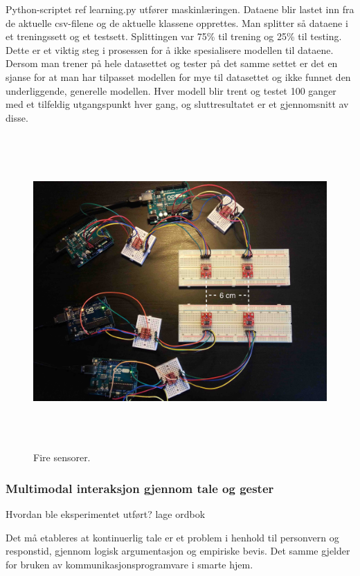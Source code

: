 Python-scriptet {\color{red} ref learning.py} utfører maskinlæringen. Dataene blir lastet inn fra de aktuelle csv-filene og de aktuelle klassene opprettes. Man splitter så dataene i et treningssett og et testsett. Splittingen var 75\% til trening og 25\% til testing. Dette er et viktig steg i prosessen for å ikke spesialisere modellen til dataene. Dersom man trener på hele datasettet og tester på det samme settet er det en sjanse for at man har tilpasset modellen for mye til datasettet og ikke funnet den underliggende, generelle modellen. Hver modell blir trent og testet 100 ganger med et tilfeldig utgangspunkt hver gang, og sluttresultatet er et gjennomsnitt av disse.

\begin{figure}[h]
\centering
\includegraphics[width=15cm, height=12cm]{fig/foursensors}
\caption{Fire sensorer.}
\label{fig:four-sensors}
\end{figure}



\subsubsection{Multimodal interaksjon gjennom tale og gester}
{\color{red}Hvordan ble eksperimentet utført?}
lage ordbok

Det må etableres at kontinuerlig tale er et problem i henhold til personvern og responstid, gjennom logisk argumentasjon og empiriske bevis. Det samme gjelder for bruken av kommunikasjonsprogramvare i smarte hjem.

